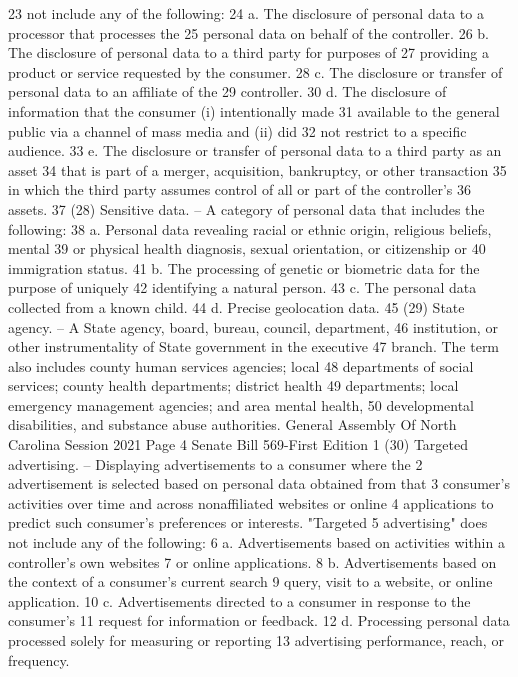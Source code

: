 23 not include any of the following:
24 a. The disclosure of personal data to a processor that processes the
25 personal data on behalf of the controller.
26 b. The disclosure of personal data to a third party for purposes of
27 providing a product or service requested by the consumer.
28 c. The disclosure or transfer of personal data to an affiliate of the
29 controller.
30 d. The disclosure of information that the consumer (i) intentionally made
31 available to the general public via a channel of mass media and (ii) did
32 not restrict to a specific audience.
33 e. The disclosure or transfer of personal data to a third party as an asset
34 that is part of a merger, acquisition, bankruptcy, or other transaction
35 in which the third party assumes control of all or part of the controller's
36 assets.
37 (28) Sensitive data. – A category of personal data that includes the following:
38 a. Personal data revealing racial or ethnic origin, religious beliefs, mental
39 or physical health diagnosis, sexual orientation, or citizenship or
40 immigration status.
41 b. The processing of genetic or biometric data for the purpose of uniquely
42 identifying a natural person.
43 c. The personal data collected from a known child.
44 d. Precise geolocation data.
45 (29) State agency. – A State agency, board, bureau, council, department,
46 institution, or other instrumentality of State government in the executive
47 branch. The term also includes county human services agencies; local
48 departments of social services; county health departments; district health
49 departments; local emergency management agencies; and area mental health,
50 developmental disabilities, and substance abuse authorities.
General Assembly Of North Carolina Session 2021
Page 4 Senate Bill 569-First Edition
1 (30) Targeted advertising. – Displaying advertisements to a consumer where the
2 advertisement is selected based on personal data obtained from that
3 consumer's activities over time and across nonaffiliated websites or online
4 applications to predict such consumer's preferences or interests. "Targeted
5 advertising" does not include any of the following:
6 a. Advertisements based on activities within a controller's own websites
7 or online applications.
8 b. Advertisements based on the context of a consumer's current search
9 query, visit to a website, or online application.
10 c. Advertisements directed to a consumer in response to the consumer's
11 request for information or feedback.
12 d. Processing personal data processed solely for measuring or reporting
13 advertising performance, reach, or frequency.
